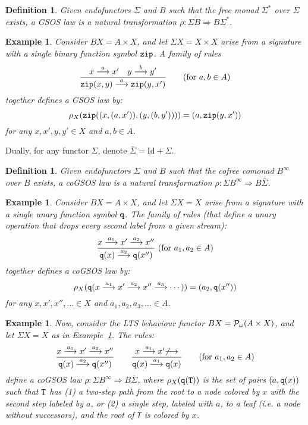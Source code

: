 \documentclass[adraft,copyright,creativecommons]{eptcs}
\newtheorem{definition}[theorem]{Definition}
\newtheorem{example}[theorem]{Example}
\newcommand{\To}{\Longrightarrow}
\newcommand{\Bid}{\tilde{B}}
\newcommand{\Bb}{B^{\infty}}
\newcommand{\Sid}{\bar{\S}}
\newcommand{\Ss}{\Sigma^*}
\renewcommand{\S}{\Sigma}
\newcommand{\Id}{\textrm{Id}}
\newcommand{\goes}[1]{\stackrel{#1}{\longrightarrow}}
\begin{document}
\begin{definition}\rm
Given endofunctors $\S$ and $B$ such that the free monad $\Ss$ over $\S$ exists, a {\em GSOS law} is a natural transformation $\rho:\S\Bid\To B\Ss$.
\end{definition}

\begin{example}\label{ex:gsos}\rm
Consider $BX=A\times X$, and let $\S X=X\times X$ arise from a signature with a single binary function symbol ${\tt zip}$. A family of rules
\[
	\dfrac{x\goes{a}x' \quad y\goes{b}y'}{{\tt zip}(x,y) \goes{a}{\tt zip}(y,x')} \qquad (\mbox{for }a,b\in A)
\]
together defines a GSOS law by:
\[
	\rho_X({\tt zip}((x,(a,x')),(y,(b,y')))) = (a,{\tt zip}(y,x'))
\]
for any $x,x',y,y'\in X$ and $a,b\in A$. 
\end{example}
\medskip

Dually, for any functor $\S$, denote $\Sid=\Id+\S$.

\begin{definition}\rm
Given endofunctors $\S$ and $B$ such that the cofree comonad $\Bb$ over $B$ exists, a {\em coGSOS law} is a natural transformation $\rho:\S\Bb\To B\Sid$.
\end{definition}

\begin{example}\label{ex:co-gsos}\rm
Consider $BX=A\times X$, 
and let $\S X=X$ arise from a signature with a single unary function symbol ${\tt q}$.
The family of rules (that define a unary operation that drops every second label from a given stream):
\begin{align*}
	\dfrac{x\goes{a_1}x'\goes{a_2}x''}{{\tt q}(x)\goes{a_2}{\tt q}(x'')}\ (\mbox{for } a_1,a_2\in A)
\end{align*}
together defines a coGSOS law by:
\[
	\rho_X({\tt q}(x\goes{a_1} x' \goes{a_2} x''\goes{a_3}\cdots)) = (a_2,{\tt q}(x''))
\]
for any $x,x',x'',\hdots \in X$ and $a_1,a_2,a_3,\hdots \in A$.
\end{example}



\begin{example}\label{ex:co-gsos-neg}\rm
Now, consider the LTS behaviour functor $BX={\cal P_\omega}(A\times X)$, and let $\S X = X$ as in Example~\ref{ex:co-gsos}. The rules:
\begin{align*}
	\dfrac{x\goes{a_1}x'\goes{a_2}x''}{{\tt q}(x)\goes{a_2}{\tt q}(x'')} \qquad 
	\dfrac{x\goes{a_1}x' {\not \goes{}}}{{\tt q}(x)\goes{a_1}{\tt q}(x)}\qquad (\mbox{for } a_1,a_2\in A)
\end{align*}
define a coGSOS law $\rho:\S\Bb\To B\Sid$, where $\rho_X({\tt q}({\tt T}))$ is the set of pairs $(a,{\tt q}(x))$ such that ${\tt T}$ has (1) a two-step path from the root to a node colored by $x$ with the second step labeled by $a$, or (2) a single step, labeled with $a$, to a leaf (i.e. a node without successors), and the root of {\tt T} is colored by $x$.
\end{example}
\end{document}

